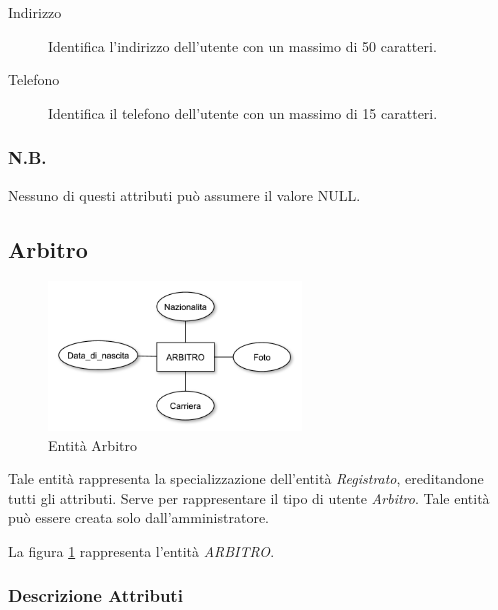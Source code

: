 		\begin{description}
			
			\item[Indirizzo]
			Identifica l'indirizzo dell'utente con un massimo di 50 caratteri.
			
			\item[Telefono]
			Identifica il telefono dell'utente con un massimo di 15 caratteri.
			
		\end{description}
		
		\subsubsection*{N.B.}
		Nessuno di questi attributi può assumere il valore NULL.
	
	\subsection{Arbitro}
		
		\begin{figure}[h]
			\centering
			\includegraphics[width=0.6\textwidth]
			{immagini/04-arbitro}
			
			\caption{Entità Arbitro}
			\label{entita-arbitro}
		\end{figure}
		
		Tale entità rappresenta la specializzazione dell'entità \emph{Registrato}, ereditandone tutti gli attributi. Serve per rappresentare il tipo di utente \emph{Arbitro}. Tale entità può essere creata solo dall'amministratore.
		
		La figura \ref{entita-arbitro} rappresenta l'entità \emph{ARBITRO}.
		
		\subsubsection*{Descrizione Attributi}
		
